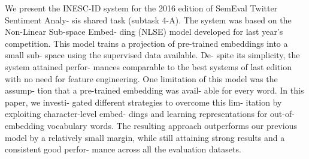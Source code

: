 We present the INESC-ID system for the 2016 edition of SemEval Twitter Sentiment Analy- sis shared task (subtask 4-A). The system was based on the Non-Linear Sub-space Embed- ding (NLSE) model developed for last year's competition. This model trains a projection of pre-trained embeddings into a small sub- space using the supervised data available. De- spite its simplicity, the system attained perfor- mances comparable to the best systems of last edition with no need for feature engineering. One limitation of this model was the assump- tion that a pre-trained embedding was avail- able for every word. In this paper, we investi- gated different strategies to overcome this lim- itation by exploiting character-level embed- dings and learning representations for out-of- embedding vocabulary words. The resulting approach outperforms our previous model by a relatively small margin, while still attaining strong results and a consistent good perfor- mance across all the evaluation datasets.
